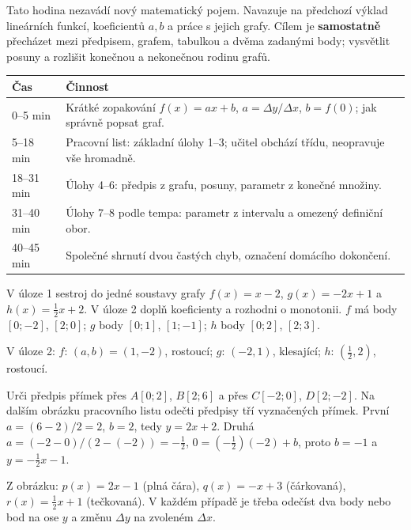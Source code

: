 \documentclass[11pt,a4paper]{article}
\begin{document}
Tato hodina nezavádí nový matematický pojem. Navazuje na předchozí výklad lineárních funkcí,
koeficientů $a,b$ a práce s jejich grafy. Cílem je \textbf{samostatně} přecházet mezi předpisem,
grafem, tabulkou a dvěma zadanými body; vysvětlit posuny a rozlišit konečnou a nekonečnou rodinu grafů.

\begin{center}
\begin{tabularx}{\linewidth}{@{}p{23mm}X@{}}\toprule
Čas & Činnost\\\midrule
0–5 min & Krátké zopakování $f(x)=ax+b$, $a=\Delta y/\Delta x$, $b=f(0)$; jak správně popsat graf.\\
5–18 min & Pracovní list: základní úlohy 1–3; učitel obchází třídu, neopravuje vše hromadně.\\
18–31 min & Úlohy 4–6: předpis z grafu, posuny, parametr z konečné množiny.\\
31–40 min & Úlohy 7–8 podle tempa: parametr z intervalu a omezený definiční obor.\\
40–45 min & Společné shrnutí dvou častých chyb, označení domácího dokončení.\\\bottomrule
\end{tabularx}
\end{center}

\begin{zadaniReseniBox}[title={Samostatná práce 1}]
V úloze 1 sestroj do jedné soustavy grafy $f(x)=x-2$,
$g(x)=-2x+1$ a $h(x)=\frac12x+2$. V úloze 2 doplň koeficienty a rozhodni o monotonii.
\tcblower
$f$ má body $[0;-2]$, $[2;0]$; $g$ body $[0;1]$, $[1;-1]$;
$h$ body $[0;2]$, $[2;3]$.\par
V úloze 2: $f$: $(a,b)=(1,-2)$, rostoucí;
$g$: $(-2,1)$, klesající;
$h$: $(\frac12,2)$, rostoucí.
\end{zadaniReseniBox}

\begin{zadaniReseniBox}[title={Samostatná práce 2}]
Urči předpis přímek přes $A[0;2]$, $B[2;6]$ a přes $C[-2;0]$, $D[2;-2]$.
Na dalším obrázku pracovního listu odečti předpisy tří vyznačených přímek.
\tcblower
První $a=(6-2)/2=2$, $b=2$, tedy $y=2x+2$.
Druhá $a=(-2-0)/(2-(-2))=-\frac12$,
$0=(-\frac12)(-2)+b$, proto $b=-1$ a $y=-\frac12x-1$.\par
Z obrázku: $p(x)=2x-1$ (plná čára), $q(x)=-x+3$ (čárkovaná),
$r(x)=\frac12x+1$ (tečkovaná). V každém případě je třeba odečíst dva body
nebo bod na ose $y$ a změnu $\Delta y$ na zvoleném $\Delta x$.
\end{zadaniReseniBox}
\end{document}
